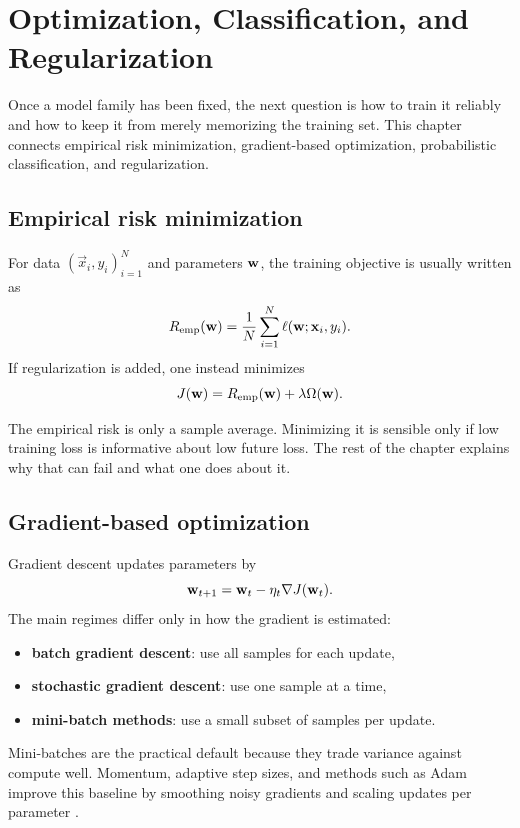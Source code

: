 \chapter{Optimization, Classification, and Regularization}

Once a model family has been fixed, the next question is how to train it reliably and how to keep it from merely memorizing the training set. This chapter connects empirical risk minimization, gradient-based optimization, probabilistic classification, and regularization.

\section{Empirical risk minimization}

For data $(\vec{x}_i, y_i)_{i=1}^{N}$ and parameters $\mathbf{w}$, the training objective is usually written as
\[
  R_{\mathrm{emp}}(\mathbf{w})
  =
  \frac{1}{N}\sum_{i=1}^{N} \ell(\mathbf{w};\mathbf{x}_i,y_i).
\]
If regularization is added, one instead minimizes
\[
  J(\mathbf{w}) = R_{\mathrm{emp}}(\mathbf{w}) + \lambda \Omega(\mathbf{w}).
\]

\begin{aside}
The empirical risk is only a sample average. Minimizing it is sensible only if low training loss is informative about low future loss. The rest of the chapter explains why that can fail and what one does about it.
\end{aside}

\section{Gradient-based optimization}

Gradient descent updates parameters by
\[
  \mathbf{w}_{t+1} = \mathbf{w}_t - \eta_t \nabla J(\mathbf{w}_t).
\]
The main regimes differ only in how the gradient is estimated:
\begin{itemize}
  \item \textbf{batch gradient descent}: use all samples for each update,
  \item \textbf{stochastic gradient descent}: use one sample at a time,
  \item \textbf{mini-batch methods}: use a small subset of samples per update.
\end{itemize}

Mini-batches are the practical default because they trade variance against compute well. Momentum, adaptive step sizes, and methods such as Adam improve this baseline by smoothing noisy gradients and scaling updates per parameter \parencite{goodfellow2016deep,bishop2006prml}.

